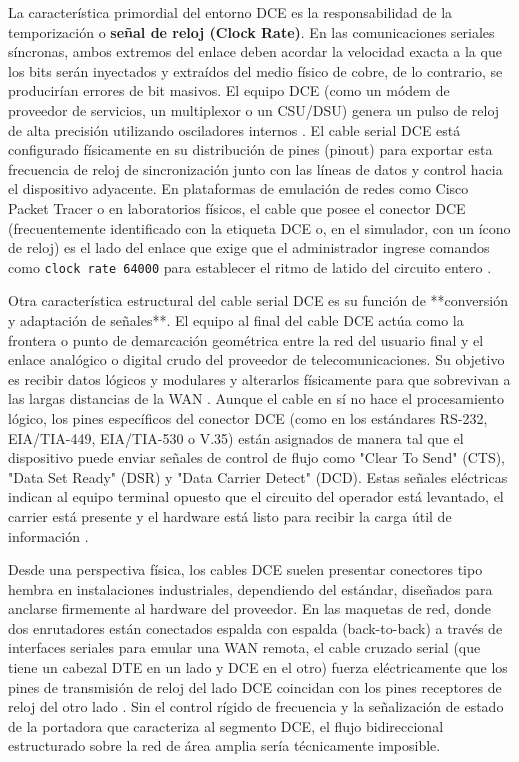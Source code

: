 \documentclass[a4paper,12pt]{article}
\begin{document}
La característica primordial del entorno DCE es la responsabilidad de la temporización o \textbf{señal de reloj (Clock Rate)}. En las comunicaciones seriales síncronas, ambos extremos del enlace deben acordar la velocidad exacta a la que los bits serán inyectados y extraídos del medio físico de cobre, de lo contrario, se producirían errores de bit masivos. El equipo DCE (como un módem de proveedor de servicios, un multiplexor o un CSU/DSU) genera un pulso de reloj de alta precisión utilizando osciladores internos \cite{dte_dce_difference, dce_dte_cables}. El cable serial DCE está configurado físicamente en su distribución de pines (pinout) para exportar esta frecuencia de reloj de sincronización junto con las líneas de datos y control hacia el dispositivo adyacente. En plataformas de emulación de redes como Cisco Packet Tracer o en laboratorios físicos, el cable que posee el conector DCE (frecuentemente identificado con la etiqueta DCE o, en el simulador, con un ícono de reloj) es el lado del enlace que exige que el administrador ingrese comandos como \texttt{clock rate 64000} para establecer el ritmo de latido del circuito entero \cite{dte_dce_difference, dte_dce_packet_tracer}.

Otra característica estructural del cable serial DCE es su función de **conversión y adaptación de señales**. El equipo al final del cable DCE actúa como la frontera o punto de demarcación geométrica entre la red del usuario final y el enlace analógico o digital crudo del proveedor de telecomunicaciones. Su objetivo es recibir datos lógicos y modulares y alterarlos físicamente para que sobrevivan a las largas distancias de la WAN \cite{dte_dce_cables}. Aunque el cable en sí no hace el procesamiento lógico, los pines específicos del conector DCE (como en los estándares RS-232, EIA/TIA-449, EIA/TIA-530 o V.35) están asignados de manera tal que el dispositivo puede enviar señales de control de flujo como "Clear To Send" (CTS), "Data Set Ready" (DSR) y "Data Carrier Detect" (DCD). Estas señales eléctricas indican al equipo terminal opuesto que el circuito del operador está levantado, el carrier está presente y el hardware está listo para recibir la carga útil de información \cite{dte_dce_difference, dte_dce_speeds}. 

Desde una perspectiva física, los cables DCE suelen presentar conectores tipo hembra en instalaciones industriales, dependiendo del estándar, diseñados para anclarse firmemente al hardware del proveedor. En las maquetas de red, donde dos enrutadores están conectados espalda con espalda (back-to-back) a través de interfaces seriales para emular una WAN remota, el cable cruzado serial (que tiene un cabezal DTE en un lado y DCE en el otro) fuerza eléctricamente que los pines de transmisión de reloj del lado DCE coincidan con los pines receptores de reloj del otro lado \cite{dte_dce_packet_tracer}. Sin el control rígido de frecuencia y la señalización de estado de la portadora que caracteriza al segmento DCE, el flujo bidireccional estructurado sobre la red de área amplia sería técnicamente imposible.
\end{document}
